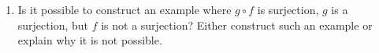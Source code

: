 \begin{activity}
\begin{enumerate}
\item Is it possible to construct an example where  $g \circ f$  is surjection,  $g$  is a surjection, but  $f$  is not a surjection?  Either construct such an example or explain why it is not possible.
\end{enumerate}
%
%
%
%
%
%
%

\end{activity}
